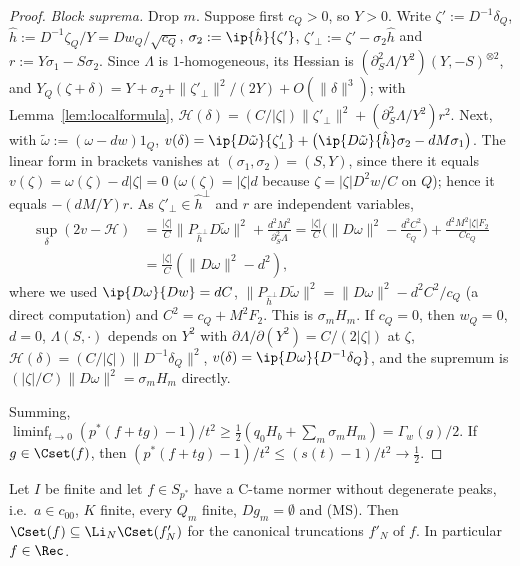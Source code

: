 \begin{proof}
\emph{Block suprema.}  Drop $m$.  Suppose first $c_Q>0$, so $Y>0$.  Write
$\zeta':=D^{-1}\delta_Q$, $\hat h:=D^{-1}\zeta_Q/Y=D w_Q/\sqrt{c_Q}$,
$\sigma_2:=\ip{\hat h}{\zeta'}$, $\zeta'_\perp:=\zeta'-\sigma_2\hat h$ and
$r:=Y\sigma_1-S\sigma_2$.  Since $\Lambda$ is $1$-homogeneous, its Hessian
is $(\partial_S^2\Lambda/Y^2)(Y,-S)^{\otimes2}$, and
$Y_Q(\zeta+\delta)=Y+\sigma_2+\|\zeta'_\perp\|^2/(2Y)+O(\|\delta\|^3)$;
with Lemma~\ref{lem:localformula},
$\mathcal H(\delta)=(C/|\zeta|)\|\zeta'_\perp\|^2+(\partial_S^2\Lambda/Y^2)
r^2$.  Next, with $\tilde\omega:=(\omega-dw)1_Q$,
$v(\delta)=\ip{D\tilde\omega}{\zeta'_\perp}+\big(\ip{D\tilde\omega}{\hat h}
\sigma_2-dM\sigma_1\big)$.  The linear form in brackets vanishes at
$(\sigma_1,\sigma_2)=(S,Y)$, since there it equals $v(\zeta)=\omega(\zeta)
-d|\zeta|=0$ ($\omega(\zeta)=|\zeta|d$ because $\zeta=|\zeta|D^2w/C$ on $Q$);
hence it equals $-(dM/Y)r$.  As $\zeta'_\perp\in\hat h^\perp$ and $r$ are
independent variables,
\begin{align*}
 \sup_\delta(2v-\mathcal H)&=\frac{|\zeta|}C\|P_{\hat h^\perp}D\tilde\omega
 \|^2+\frac{d^2M^2}{\partial_S^2\Lambda}
 =\frac{|\zeta|}C\Big(\|D\omega\|^2-\frac{d^2C^2}{c_Q}\Big)+
 \frac{d^2M^2|\zeta|F_2}{Cc_Q}\\
 &=\frac{|\zeta|}C(\|D\omega\|^2-d^2),
\end{align*}
where we used $\ip{D\omega}{Dw}=dC$, $\|P_{\hat h^\perp}D\tilde\omega\|^2=
\|D\omega\|^2-d^2C^2/c_Q$ (a direct computation) and $C^2=c_Q+M^2F_2$.  This
is $\sigma_mH_m$.  If $c_Q=0$, then $w_Q=0$, $d=0$, $\Lambda(S,\cdot)$
depends on $Y^2$ with $\partial\Lambda/\partial(Y^2)=C/(2|\zeta|)$ at
$\zeta$, $\mathcal H(\delta)=(C/|\zeta|)\|D^{-1}\delta_Q\|^2$,
$v(\delta)=\ip{D\omega}{D^{-1}\delta_Q}$, and the supremum is
$(|\zeta|/C)\|D\omega\|^2=\sigma_mH_m$ directly.

Summing, $\liminf_{t\to0}(p^*(f+tg)-1)/t^2\ge\frac12(q_0H_b+\sum_m\sigma_m
H_m)=\Gamma_w(g)/2$.  If $g\in\Cset(f)$, then $(p^*(f+tg)-1)/t^2\le
(s(t)-1)/t^2\to\frac12$.
\end{proof}

\begin{theorem}\label{thm:tame}
Let $I$ be finite and let $f\in S_{p^*}$ have a C-tame normer without
degenerate peaks, i.e.\ $a\in c_{00}$, $K$ finite, every $Q_m$ finite,
$Dg_m=\emptyset$ and \textup{(MS)}.  Then
$\Cset(f)\subseteq\Li_N\Cset(f'_N)$ for the canonical truncations
$f'_N$ of $f$.  In particular $f\in\Rec$.
\end{theorem}

